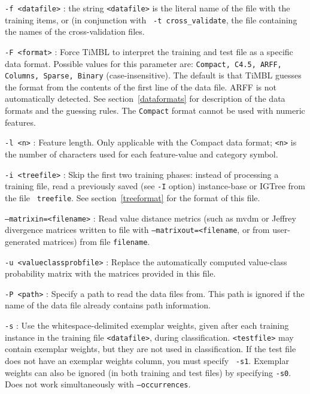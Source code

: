 \documentclass{book}
\begin{document}
\begin{description}

\item {\tt -f <datafile>} : the string {\tt <datafile>} is the literal
name of the file with the training items, or (in conjunction with {\tt
-t cross\_validate}, the file containing the names of the
cross-validation files.

\item {\tt -F <format>} : Force TiMBL to interpret the training and
test file as a specific data format. Possible values for this
parameter are: {\tt Compact, C4.5, ARFF, Columns, Sparse, Binary}
(case-insensitive). The default is that TiMBL guesses the format from
the contents of the first line of the data file. ARFF is not
automatically detected. See section~\ref{dataformats} for description
of the data formats and the guessing rules. The {\tt Compact} format
cannot be used with numeric features.

\item {\tt -l <n>} : Feature length. Only applicable with the Compact
  data format; {\tt <n>} is the number of characters used for each
  feature-value and category symbol.

\item {\tt -i <treefile>} : Skip the first two training phases:
  instead of processing a training file, read a previously saved (see
  {\tt -I} option) instance-base or {\sc IGTree} from the file {\tt
    treefile}. See section~\ref{treeformat} for the format of this
  file.

\item {\tt --matrixin=<filename>} : Read value distance metrics (such
  as {\sc mvdm} or Jeffrey divergence matrices written to file with
  {\tt --matrixout=<filename}, or from user-generated matrices) from
  file {\tt filename}.

\item {\tt -u <valueclassprobfile>} : Replace the automatically
  computed value-class probability matrix with the matrices provided
  in this file.

\item {\tt -P <path>} : Specify a path to read the data files
  from. This path is ignored if the name of the data file already
  contains path information.

\item {\tt -s} : Use the whitespace-delimited exemplar weights, given
  after each training instance in the training file {\tt <datafile>},
  during classification. {\tt <testfile>} may contain exemplar
  weights, but they are not used in classification. If the test file
  does not have an exemplar weights column, you must specify {\tt
    -s1}. Exemplar weights can also be ignored (in both training and
  test files) by specifying {\tt -s0}. Does not work simultaneously
  with {\tt --occurrences}.


\end{description}
\end{document}
